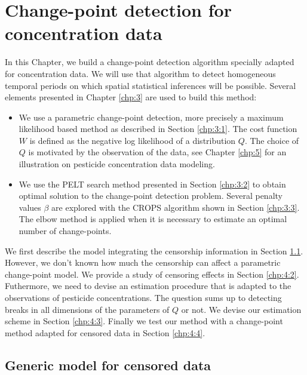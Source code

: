\chapter{Change-point detection for concentration data}\label{chp:4}

\minitoc

\clearpage

In this Chapter, we build a change-point detection algorithm specially adapted for concentration data. We will use that algorithm to detect homogeneous temporal periods on which spatial statistical inferences will be possible. Several elements presented in Chapter \ref{chp:3} are used to build this method:  
\begin{itemize}
\item We use a parametric change-point detection, more precisely a maximum likelihood based method as described in Section \ref{chp:3:1}. The cost function $W$ is defined as the negative log likelihood of a distribution $Q$. The choice of $Q$ is motivated by the observation of the data, see Chapter \ref{chp:5} for an illustration on pesticide concentration data modeling.  
\item We use the PELT search method presented in Section \ref{chp:3:2} to obtain optimal solution to the change-point detection problem. Several penalty values $\beta$ are explored with the CROPS algorithm shown in Section \ref{chp:3:3}. The elbow method is applied when it is necessary to estimate an optimal number of change-points.   
\end{itemize}
We first describe the model integrating the censorship information in Section \ref{chp:4:1}. However, we don't known how much the censorship can affect a parametric change-point model. We provide a study of censoring effects in Section \ref{chp:4:2}. Futhermore, we need to devise an estimation procedure that is adapted to the observations of pesticide concentrations. The question sums up to detecting breaks in all dimensions of the parameters of $Q$ or not. We devise our estimation scheme in Section \ref{chp:4:3}. Finally we test our method with a change-point method adapted for censored data in Section \ref{chp:4:4}.  


\section{Generic model for censored data}\label{chp:4:1}

